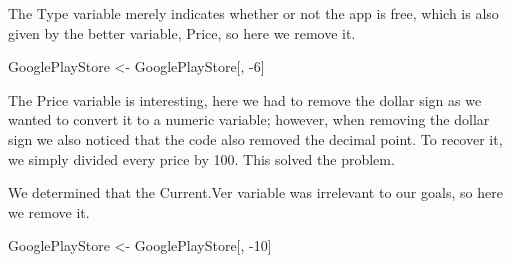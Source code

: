 \documentclass[]{article}
\newenvironment{Shaded}{\begin{snugshade}}{\end{snugshade}}
\newcommand{\CharTok}[1]{\textcolor[rgb]{0.31,0.60,0.02}{#1}}
\newcommand{\DecValTok}[1]{\textcolor[rgb]{0.00,0.00,0.81}{#1}}
\newcommand{\KeywordTok}[1]{\textcolor[rgb]{0.13,0.29,0.53}{\textbf{#1}}}
\newcommand{\NormalTok}[1]{#1}
\newcommand{\OperatorTok}[1]{\textcolor[rgb]{0.81,0.36,0.00}{\textbf{#1}}}
\newcommand{\StringTok}[1]{\textcolor[rgb]{0.31,0.60,0.02}{#1}}
\begin{document}
\begin{Shaded}
\end{Shaded}

The Type variable merely indicates whether or not the app is free, which
is also given by the better variable, Price, so here we remove it.

\begin{Shaded}
\begin{Highlighting}[]
\NormalTok{GooglePlayStore <-}\StringTok{ }\NormalTok{GooglePlayStore[, }\DecValTok{-6}\NormalTok{]}
\end{Highlighting}
\end{Shaded}

The Price variable is interesting, here we had to remove the dollar sign
as we wanted to convert it to a numeric variable; however, when removing
the dollar sign we also noticed that the code also removed the decimal
point. To recover it, we simply divided every price by 100. This solved
the problem.

\begin{Shaded}
\end{Shaded}

We determined that the Current.Ver variable was irrelevant to our goals,
so here we remove it.

\begin{Shaded}
\begin{Highlighting}[]
\NormalTok{GooglePlayStore <-}\StringTok{ }\NormalTok{GooglePlayStore[, }\DecValTok{-10}\NormalTok{]}
\end{Highlighting}
\end{Shaded}
\end{document}

